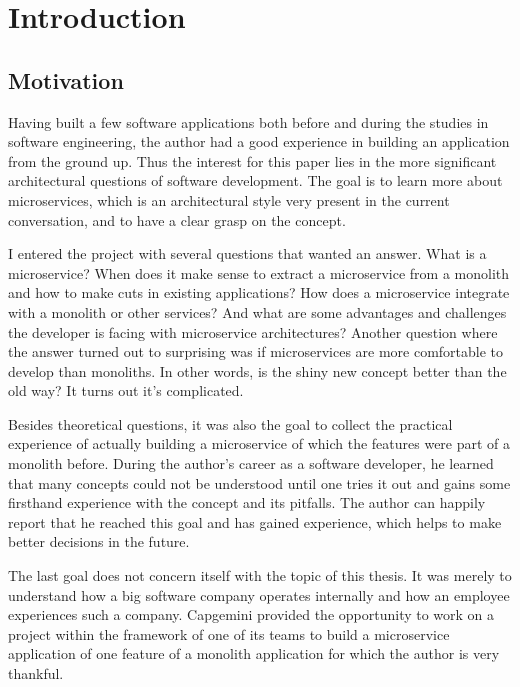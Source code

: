 \chapter{Introduction}
\label{sec:intro}

\section{Motivation}
\label{sec:intro-motivation}

Having built a few software applications both before and during the studies in software engineering, the author had a good experience in building an application from the ground up. Thus the interest for this paper lies in the more significant architectural questions of software development. The goal is to learn more about microservices, which is an architectural style very present in the current conversation, and to have a clear grasp on the concept.

I entered the project with several questions that wanted an answer. What is a microservice? When does it make sense to extract a microservice from a monolith and how to make cuts in existing applications? How does a microservice integrate with a monolith or other services? And what are some advantages and challenges the developer is facing with microservice architectures? Another question where the answer turned out to surprising was if microservices are more comfortable to develop than monoliths. In other words, is the shiny new concept better than the old way? It turns out it's complicated.

Besides theoretical questions, it was also the goal to collect the practical experience of actually building a microservice of which the features were part of a monolith before. During the author's career as a software developer, he learned that many concepts could not be understood until one tries it out and gains some firsthand experience with the concept and its pitfalls. The author can happily report that he reached this goal and has gained experience, which helps to make better decisions in the future.

The last goal does not concern itself with the topic of this thesis. It was merely to understand how a big software company operates internally and how an employee experiences such a company. Capgemini provided the opportunity to work on a project within the framework of one of its teams to build a microservice application of one feature of a monolith application for which the author is very thankful.


